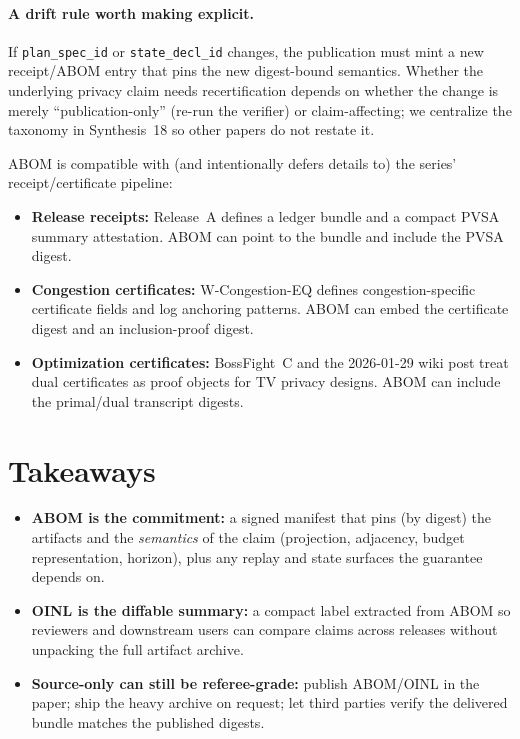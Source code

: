 \documentclass[11pt]{article}
\begin{document}
\paragraph{A drift rule worth making explicit.}
If \texttt{plan\_spec\_id} or \texttt{state\_decl\_id} changes, the publication must mint a new receipt/ABOM entry that pins the new digest-bound semantics.
Whether the underlying privacy claim needs recertification depends on whether the change is merely ``publication-only'' (re-run the verifier) or claim-affecting; we centralize the taxonomy in Synthesis~18 so other papers do not restate it.\cite{series:planstateequiv}

ABOM is compatible with (and intentionally defers details to) the series' receipt/certificate pipeline:
\begin{itemize}[leftmargin=*]
\item \textbf{Release receipts:} Release~A defines a ledger bundle and a compact PVSA summary attestation.\cite{series:releaseproperty}
ABOM can point to the bundle and include the PVSA digest.
\item \textbf{Congestion certificates:} W-Congestion-EQ defines congestion-specific certificate fields and log anchoring patterns.\cite{series:wcongeq}
ABOM can embed the certificate digest and an inclusion-proof digest.
\item \textbf{Optimization certificates:} BossFight~C and the 2026-01-29 wiki post treat dual certificates as proof objects for TV privacy designs.
ABOM can include the primal/dual transcript digests.
\end{itemize}

\section{Takeaways}
\begin{itemize}[leftmargin=*]
\item \textbf{ABOM is the commitment:} a signed manifest that pins (by digest) the artifacts and the \emph{semantics} of the claim (projection, adjacency, budget representation, horizon), plus any replay and state surfaces the guarantee depends on.
\item \textbf{OINL is the diffable summary:} a compact label extracted from ABOM so reviewers and downstream users can compare claims across releases without unpacking the full artifact archive.
\item \textbf{Source-only can still be referee-grade:} publish ABOM/OINL in the paper; ship the heavy archive on request; let third parties verify the delivered bundle matches the published digests.
\end{itemize}
\end{document}
